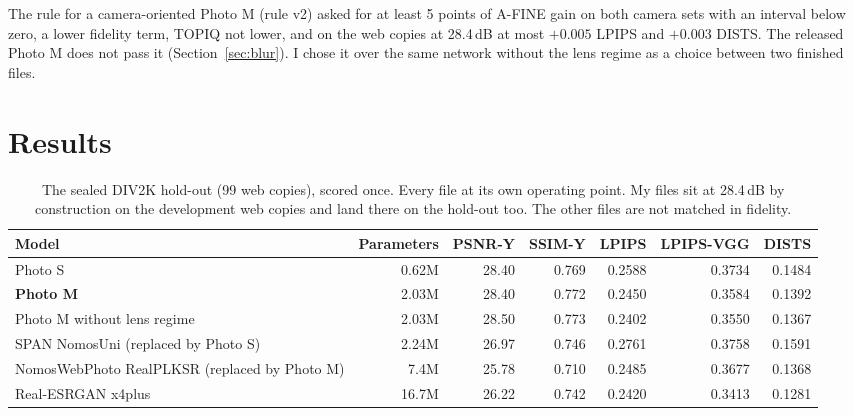 \documentclass[conference]{IEEEtran}
\begin{document}
The rule for a camera-oriented Photo M (rule v2) asked for at least 5 points of A-FINE gain on both camera sets with an
interval below zero, a lower fidelity term, TOPIQ not lower, and on the web copies at 28.4\,dB at most $+0.005$
LPIPS and $+0.003$ DISTS. The released Photo M does not pass it (Section~\ref{sec:blur}). I chose it over the same
network without the lens regime as a choice between two finished files.

\section{Results}

\begin{table}[t]
\centering
\caption{The sealed DIV2K hold-out (99 web copies), scored once. Every file at its own operating point. My files sit
at 28.4\,dB by construction on the development web copies and land there on the hold-out too. The other files are not
matched in fidelity.}
\label{tab:sealed}\small
\begin{tabular}{lrrrrrr}
\toprule
Model & Parameters & PSNR-Y & SSIM-Y & LPIPS & LPIPS-VGG & DISTS \\
\midrule
Photo S & 0.62M & 28.40 & 0.769 & 0.2588 & 0.3734 & 0.1484 \\
\textbf{Photo M} & 2.03M & 28.40 & 0.772 & 0.2450 & 0.3584 & 0.1392 \\
Photo M without lens regime & 2.03M & 28.50 & 0.773 & 0.2402 & 0.3550 & 0.1367 \\
SPAN NomosUni (replaced by Photo S) & 2.24M & 26.97 & 0.746 & 0.2761 & 0.3758 & 0.1591 \\
NomosWebPhoto RealPLKSR (replaced by Photo M) & 7.4M & 25.78 & 0.710 & 0.2485 & 0.3677 & 0.1368 \\
Real-ESRGAN x4plus & 16.7M & 26.22 & 0.742 & 0.2420 & 0.3413 & 0.1281 \\
\bottomrule
\end{tabular}
\end{table}
\end{document}
